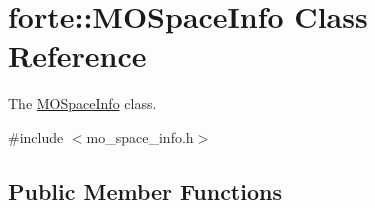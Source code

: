 \hypertarget{classforte_1_1_m_o_space_info}{}\section{forte\+:\+:M\+O\+Space\+Info Class Reference}
\label{classforte_1_1_m_o_space_info}


The \mbox{\hyperlink{classforte_1_1_m_o_space_info}{M\+O\+Space\+Info}} class.  




{\ttfamily \#include $<$mo\+\_\+space\+\_\+info.\+h$>$}

\subsection*{Public Member Functions}
